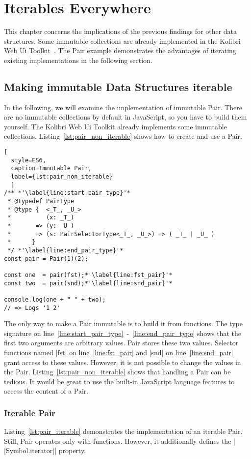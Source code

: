 \section{Iterables Everywhere}
\label{sec:Iterables Everywhere}
This chapter concerns the implications of the previous findings for other
data structures.
Some immutable collections are already implemented in the Kolibri Web Ui
Toolkit~\cite{kolibri}. The Pair example demonstrates the advantages of 
iterating existing implementations in the following section.

\subsection{Making immutable Data Structures iterable}
\label{sub:Making immutable Data Structures iterable}
In the following, we will examine the implementation of immutable Pair. 
There are no immutable collections by default in JavaScript, so you have to 
build them yourself. The Kolibri Web Ui Toolkit already implements some 
immutable collections. Listing~\ref{lst:pair_non_iterable} shows how to create and use a Pair.

\begin{lstlisting}[
  style=ES6, 
  caption=Immutable Pair,
  label={lst:pair_non_iterable}
  ]
/** *'\label{line:start_pair_type}'*
 * @typedef PairType
 * @type {  <_T_, _U_>
 *          (x: _T_)
 *       => (y: _U_)
 *       => (s: PairSelectorType<_T_, _U_>) => ( _T_ | _U_ ) 
 *      }
 */ *'\label{line:end_pair_type}'*
const pair = Pair(1)(2);

const one  = pair(fst);*'\label{line:fst_pair}'*
const two  = pair(snd);*'\label{line:snd_pair}'*

console.log(one + " " + two);
// => Logs '1 2'
\end{lstlisting}

The only way to make a Pair immutable is to build it from functions. The type 
signature on line~\ref{line:start_pair_type}~-~\ref{line:end_pair_type} shows 
that the first two arguments are arbitrary values. Pair stores these two values. 
Selector functions named |fst| on line~\ref{line:fst_pair} and |snd| on 
line~\ref{line:snd_pair} grant access to these values. However, it is not 
possible to change the values in the Pair.
Listing~\ref{lst:pair_non_iterable} shows that handling a Pair can be tedious. 
It would be great to use the built-in JavaScript language features to access 
the content of a Pair. 

\subsubsection{Iterable Pair}
\label{subsub:Iterable Pair}
Listing~\ref{lst:pair_iterable} demonstrates the implementation of an iterable 
Pair. Still, Pair operates only with functions. However, it additionally defines the
|[Symbol.iterator]| property.

